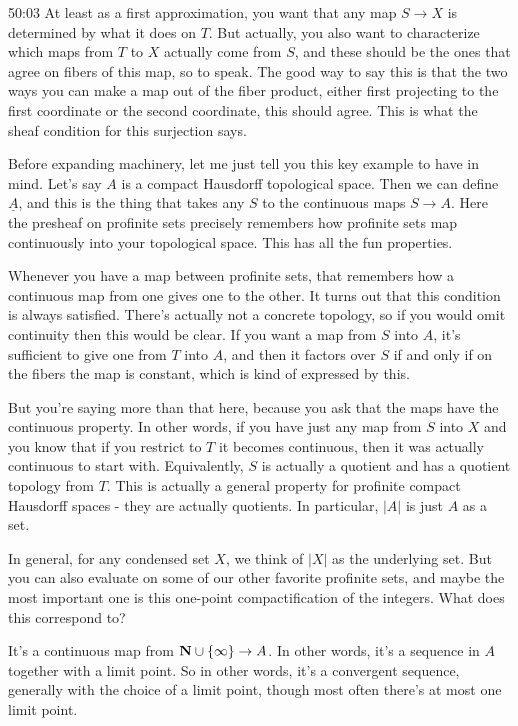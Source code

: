 \begin{example}
\begin{unfinished}{50:03}
At least as a first approximation, you want that any map $S \to X$ is determined by what it does on $T$. But actually, you also want to characterize which maps from $T$ to $X$ actually come from $S$, and these should be the ones that agree on fibers of this map, so to speak. The good way to say this is that the two ways you can make a map out of the fiber product, either first projecting to the first coordinate or the second coordinate, this should agree. This is what the sheaf condition for this surjection says.

Before expanding machinery, let me just tell you this key example to have in mind. Let's say $A$ is a compact Hausdorff topological space. Then we can define $\underline{A}$, and this is the thing that takes any $S$ to the continuous maps $S \to A$. Here the presheaf on profinite sets precisely remembers how profinite sets map continuously into your topological space. This has all the fun properties.

Whenever you have a map between profinite sets, that remembers how a continuous map from one gives one to the other. It turns out that this condition is always satisfied. There's actually not a concrete topology, so if you would omit continuity then this would be clear. If you want a map from $S$ into $A$, it's sufficient to give one from $T$ into $A$, and then it factors over $S$ if and only if on the fibers the map is constant, which is kind of expressed by this.

But you're saying more than that here, because you ask that the maps have the continuous property. In other words, if you have just any map from $S$ into $X$ and you know that if you restrict to $T$ it becomes continuous, then it was actually continuous to start with. Equivalently, $S$ is actually a quotient and has a quotient topology from $T$. This is actually a general property for profinite compact Hausdorff spaces - they are actually quotients. In particular, $|A|$ is just $A$ as a set.

In general, for any condensed set $X$, we think of $|X|$ as the underlying set. But you can also evaluate on some of our other favorite profinite sets, and maybe the most important one is this one-point compactification of the integers. What does this correspond to?

It's a continuous map from $\mathbf N \cup \{\infty\} \to A$. In other words, it's a sequence in $A$ together with a limit point. So in other words, it's a convergent sequence, generally with the choice of a limit point, though most often there's at most one limit point. 


\end{unfinished}
\end{example}
